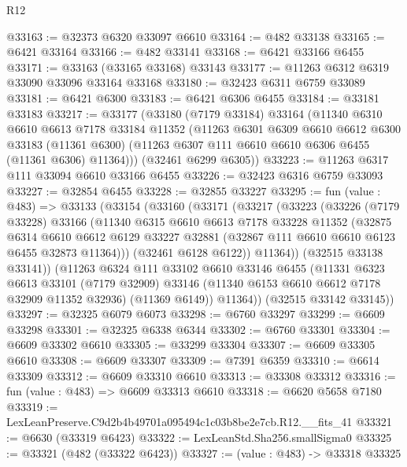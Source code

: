 \begin{lexlean}{R12}
\begin{coremodule}
@33163 := @32373 @6320 @33097 @6610
@33164 := @482 @33138
@33165 := @6421 @33164
@33166 := @482 @33141
@33168 := @6421 @33166 @6455
@33171 := @33163 (@33165 @33168) @33143
@33177 := @11263 @6312 @6319 @33090 @33096 @33164 @33168
@33180 := @32423 @6311 @6759 @33089
@33181 := @6421 @6300
@33183 := @6421 @6306 @6455
@33184 := @33181 @33183
@33217 := @33177
    (@33180
      (@7179 @33184)
      @33164
      (@11340
        @6310
        @6610
        @6613
        @7178
        @33184
        @11352
        (@11263
          @6301
          @6309
          @6610
          @6612
          @6300
          @33183
          (@11361 @6300)
          (@11263 @6307 @111 @6610 @6610 @6306 @6455 (@11361 @6306) @11364)))
      (@32461 @6299 @6305))
@33223 := @11263 @6317 @111 @33094 @6610 @33166 @6455
@33226 := @32423 @6316 @6759 @33093
@33227 := @32854 @6455
@33228 := @32855 @33227
@33295 := fun (value : @483) =>
  @33133
    (@33154
      (@33160
        (@33171
          (@33217
            (@33223
              (@33226
                (@7179 @33228)
                @33166
                (@11340
                  @6315
                  @6610
                  @6613
                  @7178
                  @33228
                  @11352
                  (@32875
                    @6314
                    @6610
                    @6612
                    @6129
                    @33227
                    @32881
                    (@32867 @111 @6610 @6610 @6123 @6455 @32873 @11364)))
                (@32461 @6128 @6122))
              @11364))
          (@32515 @33138 @33141))
        (@11263
          @6324
          @111
          @33102
          @6610
          @33146
          @6455
          (@11331
            @6323
            @6613
            @33101
            (@7179 @32909)
            @33146
            (@11340 @6153 @6610 @6612 @7178 @32909 @11352 @32936)
            (@11369 @6149))
          @11364))
      (@32515 @33142 @33145))
@33297 := @32325 @6079 @6073
@33298 := @6760 @33297
@33299 := @6609 @33298
@33301 := @32325 @6338 @6344
@33302 := @6760 @33301
@33304 := @6609 @33302 @6610
@33305 := @33299 @33304
@33307 := @6609 @33305 @6610
@33308 := @6609 @33307
@33309 := @7391 @6359
@33310 := @6614 @33309
@33312 := @6609 @33310 @6610
@33313 := @33308 @33312
@33316 := fun (value : @483) => @6609 @33313 @6610
@33318 := @6620 @5658 @7180
@33319 := LexLeanPreserve.C9d2b4b49701a095494c1c03b8be2e7cb.R12.__fits_41
@33321 := @6630 (@33319 @6423)
@33322 := LexLeanStd.Sha256.smallSigma0
@33325 := @33321 (@482 (@33322 @6423))
@33327 := (value : @483) -> @33318 @33325

\end{coremodule}
\end{lexlean}
